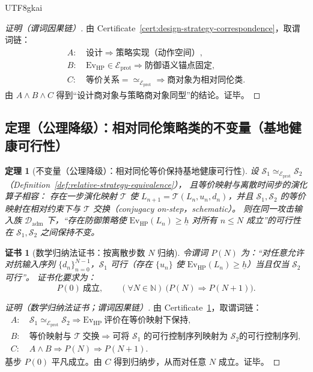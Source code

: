 \documentclass[12pt]{article}
\newtheorem{theorem}{定理}[section]
\newtheorem{certificate}{证书}[section]
\begin{document}
\begin{CJK*}{UTF8}{gkai}
\begin{proof}[证明（谓词因果链）]
由 Certificate~\ref{cert:design-strategy-correspondence}，取谓词链：
\[
\begin{aligned}
A:&\ \text{设计}\Rightarrow \text{策略实现（动作空间）},\\
B:&\ \mathrm{Ev}_{\mathrm{HP}}\in\mathcal{E}_{\mathrm{prot}}\Rightarrow \text{防御语义锚点固定},\\
C:&\ \text{等价关系}= \simeq_{\mathcal{E}_{\mathrm{prot}}}\Rightarrow \text{商对象为相对同伦类}.
\end{aligned}
\]
由 $A\wedge B\wedge C$ 得到“设计商对象与策略商对象同型”的结论。证毕。
\end{proof}

\subsection{定理（公理降级）：相对同伦策略类的不变量（基地健康可行性）}

\begin{theorem}[不变量（公理降级）：相对同伦等价保持基地健康可行性]
\label{thm:relative-strategy-feasibility-invariant}
设 $\mathcal{S}_1\simeq_{\mathcal{E}_{\mathrm{prot}}}\mathcal{S}_2$（Definition~\ref{def:relative-strategy-equivalence}），
  且等价映射与离散时间步的演化算子相容：
存在一步演化映射 $\mathcal{T}$ 使 $L_{n+1}=\mathcal{T}(L_n,u_n,d_n)$，并且 $\mathcal{S}_1,\mathcal{S}_2$ 的等价映射在相对约束下与 $\mathcal{T}$
  交换（conjugacy on-step，schematic）。
则在同一攻击输入族 $\mathcal{D}_{\mathrm{adm}}$ 下，“存在防御策略使 $\mathrm{Ev}_{\mathrm{HP}}(L_n)\ge \underline{h}$ 对所有 $n\le N$
  成立”的可行性在 $\mathcal{S}_1,\mathcal{S}_2$ 之间保持不变。
\end{theorem}

\begin{certificate}[数学归纳法证书：按离散步数 $N$ 归纳]
\label{cert:relative-strategy-feasibility-induction}
令谓词 $P(N)$ 为：“对任意允许对抗输入序列 $\{d_n\}_{n=0}^{N-1}$，$\mathcal{S}_1$ 可行（存在 $\{u_n\}$ 使 $\mathrm{Ev}_{\mathrm{HP}}(L_n)\ge
  \underline{h}$）当且仅当 $\mathcal{S}_2$ 可行”。
证书化要求为：
\[
P(0)\ \text{成立},\qquad
(\forall N\in\mathbb{N})\ \bigl(P(N)\Rightarrow P(N+1)\bigr).
\]
\end{certificate}

\begin{proof}[证明（数学归纳法证书；谓词因果链）]
由 Certificate~\ref{cert:relative-strategy-feasibility-induction}，取谓词链：
\[
\begin{aligned}
A:&\ \mathcal{S}_1\simeq_{\mathcal{E}_{\mathrm{prot}}}\mathcal{S}_2\Rightarrow \mathrm{Ev}_{\mathrm{HP}}\
  \text{评价在等价映射下保持},\\
B:&\ \text{等价映射与 }\mathcal{T}\ \text{交换}\Rightarrow \text{可将 }\mathcal{S}_1\text{ 的可行控制序列映射为 }\mathcal{S}_2\text{
  的可行控制序列},\\
C:&\ A\wedge B\Rightarrow P(N)\Rightarrow P(N+1).
\end{aligned}
\]
基步 $P(0)$ 平凡成立。由 $C$ 得到归纳步，从而对任意 $N$ 成立。证毕。
\end{proof}


\end{CJK*}
\end{document}
